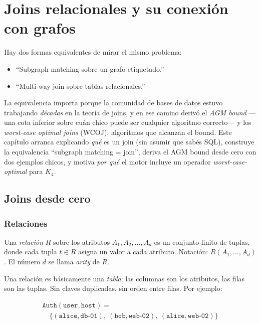 \chapter{Joins relacionales y su conexión con grafos}
\label{cap:joins-y-grafos}

\begin{intuicion}
Hay dos formas equivalentes de mirar el mismo problema:
\begin{itemize}
    \item ``Subgraph matching sobre un grafo etiquetado.''
    \item ``Multi-way join sobre tablas relacionales.''
\end{itemize}
La equivalencia importa porque la comunidad de bases de datos
estuvo trabajando \emph{décadas} en la teoría de joins, y en ese
camino derivó el \emph{AGM bound} ---una cota inferior sobre cuán
chico puede ser cualquier algoritmo correcto--- y los \emph{worst-case
optimal joins} (WCOJ), algoritmos que alcanzan el bound. Este
capítulo arranca explicando \emph{qué} es un join (sin asumir que
sabés SQL), construye la equivalencia ``subgraph matching = join'',
deriva el AGM bound desde cero con dos ejemplos chicos, y motiva
\emph{por qué} el motor incluye un operador \emph{worst-case-optimal}
para \(K_4\).
\end{intuicion}

\section{Joins desde cero}

\subsection{Relaciones}

\begin{definition}[Relación]
Una \emph{relación} \(R\) sobre los atributos
\(A_1, A_2, \dots, A_d\) es un conjunto finito de tuplas, donde cada
tupla \(t \in R\) asigna un valor a cada atributo. Notación:
\(R(A_1, \dots, A_d)\). El número \(d\) se llama \emph{arity} de \(R\).
\end{definition}

Una relación es básicamente una \emph{tabla}: las columnas son los
atributos, las filas son las tuplas. Sin claves duplicadas, sin orden
entre filas. Por ejemplo:

\[
\begin{array}{l}
\texttt{Auth}(\texttt{user}, \texttt{host}) = \\[0.2em]
\quad\{ (\texttt{alice}, \texttt{db-01}),\ (\texttt{bob}, \texttt{web-02}),\ (\texttt{alice}, \texttt{web-02}) \}
\end{array}
\]

